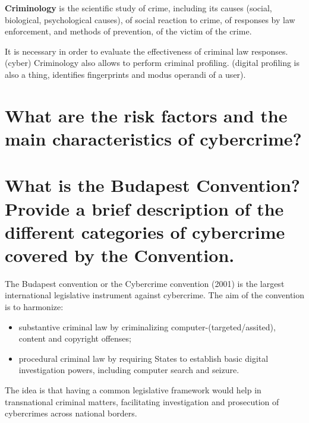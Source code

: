 \documentclass[a4paper, 11pt]{article}
\begin{document}
\textbf{Criminology} is the scientific study of crime, including its causes (social, biological, psychological causes), of social reaction to crime, of responses by law enforcement, and methods of prevention, of the victim of the crime.

It is necessary in order to evaluate the effectiveness of criminal law responses. (cyber) Criminology also allows to perform criminal profiling. (digital profiling is also a thing, identifies fingerprints and modus operandi of a user).

\section{What are the risk factors and the main characteristics of cybercrime?}


\section{What is the Budapest Convention? Provide a brief description of the different categories of cybercrime covered by the Convention.}
The Budapest convention or the Cybercrime convention (2001) is the largest international legislative instrument against cybercrime. The aim of the convention is to harmonize:
\begin{itemize}
	\item substantive criminal law by criminalizing computer-(targeted/assited), content and copyright offenses;
	\item procedural criminal law by requiring States to establish basic digital investigation powers, including	computer search and seizure.
\end{itemize}

The idea is that having a common legislative framework would help in transnational criminal matters, facilitating investigation and prosecution of cybercrimes across national borders.
\end{document}
